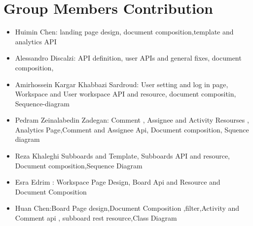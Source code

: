 \section{Group Members Contribution}

\begin{itemize}
    \item Huimin Chen: landing page design, document composition,template and analytics API
    \item Alessandro Discalzi: API definition, user APIs and general fixes,  document composition,
    \item Amirhossein Kargar Khabbazi Sardroud: User setting and log in page, Workspace and User workspace API and resource, document compositin, Sequence-diagram
    \item Pedram Zeinalabedin Zadegan: Comment , Assignee and Activity Resourses , Analytics Page,Comment and Assignee Api, Document composition, Squence diagram
    \item Reza Khaleghi  Subboards and Template, Subboards API and resource, Document composition,Sequence Diagram
    \item Esra Edrim : Workspace Page Design, Board Api and Resource and Document Composition 
    \item Huan Chen:Board Page design,Document Composition ,filter,Activity and Comment api , subboard rest resource,Class Diagram 
\end{itemize}